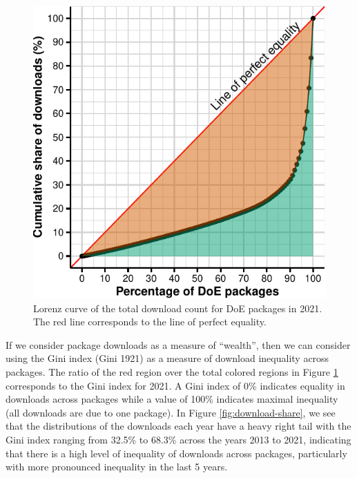 \documentclass{article}
\begin{document}
\begin{figure}[htbp]

{\centering \includegraphics{figures/plot-lorenz-1} 

}

\caption{Lorenz curve of the total download count for DoE packages in 2021. The red line corresponds to the line of perfect equality.}\label{fig:plot-lorenz}
\end{figure}

If we consider package downloads as a measure of ``wealth'', then we can
consider using the Gini index (Gini 1921) as a measure of download
inequality across packages. The ratio of the red region over the total
colored regions in Figure \ref{fig:plot-lorenz} corresponds to the Gini
index for 2021. A Gini index of 0\% indicates equality in downloads
across packages while a value of 100\% indicates maximal inequality (all
downloads are due to one package). In Figure \ref{fig:download-share},
we see that the distributions of the downloads each year have a heavy
right tail with the Gini index ranging from 32.5\% to 68.3\% across the
years 2013 to 2021, indicating that there is a high level of inequality
of downloads across packages, particularly with more pronounced
inequality in the last 5 years.
\end{document}
